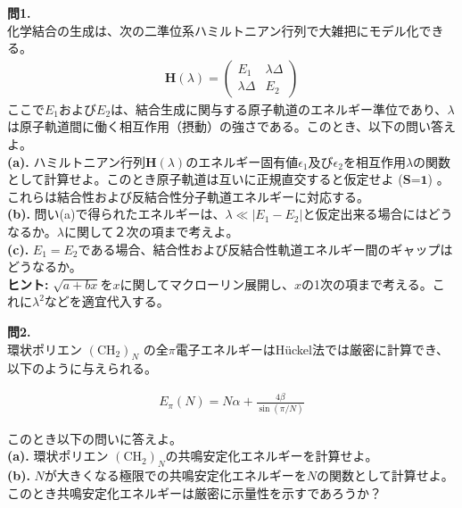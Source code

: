 \documentclass{jlreq}
\begin{document}
\noindent
\textbf{問1.}\\

\noindent
化学結合の生成は、次の二準位系ハミルトニアン行列で大雑把にモデル化できる。
\begin{eqnarray}
    \mathbf{H}(\lambda)=
    \begin{pmatrix}
    E_1 & \lambda\Delta \\ 
    \lambda\Delta & E_2
    \end{pmatrix}
\end{eqnarray}
ここで$E_1$および$E_2$は、結合生成に関与する原子軌道のエネルギー準位であり、$\lambda$は原子軌道間に働く相互作用（摂動）の強さである。このとき、以下の問い答えよ。\\

\noindent
\textbf{(a).} ハミルトニアン行列$\mathbf{H}(\lambda)$のエネルギー固有値$\epsilon_1$及び$\epsilon_2$を相互作用$\lambda$の関数として計算せよ。このとき原子軌道は互いに正規直交すると仮定せよ ($\mathbf{S}$=$\mathbf{1}$) 。これらは結合性および反結合性分子軌道エネルギーに対応する。\\
\noindent
\textbf{(b).} 問い(a)で得られたエネルギーは、$\lambda \ll |E_1-E_2|$と仮定出来る場合にはどうなるか。$\lambda$に関して２次の項まで考えよ。\\
\noindent
\textbf{(c).} $E_1=E_2$である場合、結合性および反結合性軌道エネルギー間のギャップはどうなるか。\\

\noindent
\textbf{ヒント:} $\sqrt{a+bx}$を$x$に関してマクローリン展開し、$x$の1次の項まで考える。これに$\lambda^2$などを適宜代入する。

\clearpage

\noindent
\textbf{問2.}\\

\noindent
環状ポリエン $(\text{CH}_2)_N$ の全$\pi$電子エネルギーはH\"uckel法では厳密に計算でき、以下のように与えられる。

\begin{eqnarray}
    E_\pi(N)=N\alpha+\frac{4\beta}{\sin(\pi/N)}
\end{eqnarray}

\noindent
このとき以下の問いに答えよ。\\

\noindent
\textbf{(a).} 環状ポリエン $(\text{CH}_2)_N$の共鳴安定化エネルギーを計算せよ。\\
\noindent
\textbf{(b).} $N$が大きくなる極限での共鳴安定化エネルギーを$N$の関数として計算せよ。このとき共鳴安定化エネルギーは厳密に示量性を示すであろうか？\\
\end{document}
